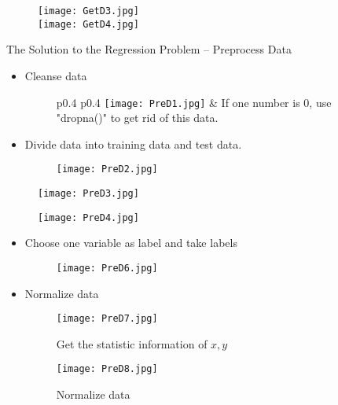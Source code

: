 \documentclass{beamer}
\begin{document}
\begin{frame}
\begin{figure}
  \texttt{[image: GetD3.jpg]}\\
  \texttt{[image: GetD4.jpg]}\\
\end{figure}
\end{frame}


\begin{frame}{The Solution to the Regression Problem -- Preprocess Data}
\begin{itemize}
  \item Cleanse data
  \begin{figure}
  \begin{tabular}{p{0.4\textwidth} p{0.4\textwidth}}
  \vspace{-10pt} \texttt{[image: PreD1.jpg]}
  &\vspace{-5pt} \small{If one number is 0, use "dropna()" to get rid of this data.}
  \end{tabular}
\end{figure}
  \item Divide data into training data and test data.
\begin{figure}
\centering
  \texttt{[image: PreD2.jpg]}\\
\end{figure}
\end{itemize}
\begin{figure}
\begin{minipage}[t]{0.4\linewidth}
\centering
\texttt{[image: PreD3.jpg]}
\end{minipage}
\begin{minipage}[t]{0.4\linewidth}
\centering
\texttt{[image: PreD4.jpg]}
\end{minipage}
\end{figure}
\end{frame}

\begin{frame}
\begin{itemize}
  \item Choose one variable as label and take labels
\begin{figure}
  \texttt{[image: PreD6.jpg]}\\
\end{figure}
  \item Normalize data
\begin{figure}
  \texttt{[image: PreD7.jpg]}\\
  \caption{Get the statistic information of $x,y$}
\end{figure}
 \begin{figure}
  \texttt{[image: PreD8.jpg]}\\
  \caption{Normalize data}
\end{figure}
\end{itemize}
\end{frame}
\end{document}
